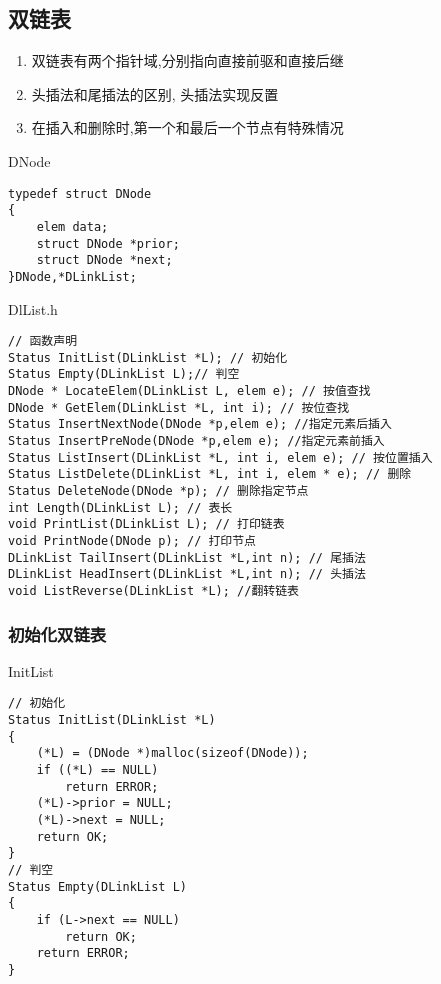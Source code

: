 \subsection{双链表}
\begin{definition}[双链表]
    \begin{enumerate}
        \item 双链表有两个指针域,分别指向直接前驱和直接后继
        \item 头插法和尾插法的区别, 头插法实现反置
        \item 在插入和删除时,第一个和最后一个节点有特殊情况
    \end{enumerate}
\end{definition}
\begin{macbox}{DNode}
	\begin{verbatim}
typedef struct DNode
{
    elem data;
    struct DNode *prior;
    struct DNode *next;
}DNode,*DLinkList;
    \end{verbatim}
\end{macbox}

\begin{macbox}{DlList.h}
    \begin{verbatim}
// 函数声明 
Status InitList(DLinkList *L); // 初始化
Status Empty(DLinkList L);// 判空
DNode * LocateElem(DLinkList L, elem e); // 按值查找
DNode * GetElem(DLinkList *L, int i); // 按位查找
Status InsertNextNode(DNode *p,elem e); //指定元素后插入
Status InsertPreNode(DNode *p,elem e); //指定元素前插入
Status ListInsert(DLinkList *L, int i, elem e); // 按位置插入
Status ListDelete(DLinkList *L, int i, elem * e); // 删除
Status DeleteNode(DNode *p); // 删除指定节点
int Length(DLinkList L); // 表长
void PrintList(DLinkList L); // 打印链表
void PrintNode(DNode p); // 打印节点
DLinkList TailInsert(DLinkList *L,int n); // 尾插法
DLinkList HeadInsert(DLinkList *L,int n); // 头插法
void ListReverse(DLinkList *L); //翻转链表
    \end{verbatim}
\end{macbox}

\subsubsection{初始化双链表}
\begin{macbox}{InitList}
	\begin{verbatim}
// 初始化
Status InitList(DLinkList *L)
{
    (*L) = (DNode *)malloc(sizeof(DNode));
    if ((*L) == NULL)
        return ERROR;
    (*L)->prior = NULL;
    (*L)->next = NULL;
    return OK;
}
// 判空
Status Empty(DLinkList L)
{
    if (L->next == NULL)
        return OK;
    return ERROR;
}
    \end{verbatim}
\end{macbox}

